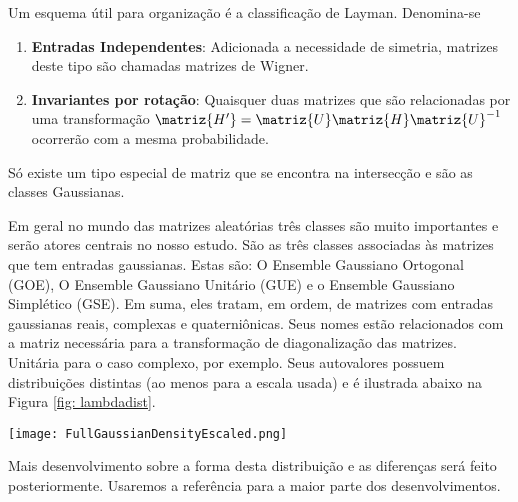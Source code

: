  Um esquema útil para organização é a classificação de Layman. Denomina-se

\begin{enumerate}
	\item \textbf{Entradas Independentes}: Adicionada a necessidade de simetria, matrizes deste tipo são chamadas matrizes de Wigner.
	\item \textbf{Invariantes por rotação}: Quaisquer duas matrizes que são relacionadas por uma transformação $\matriz{H'} = \matriz{U} \matriz{H} \matriz{U}^{-1}$ ocorrerão com a mesma probabilidade.
\end{enumerate}

Só existe um tipo especial de matriz que se encontra na intersecção e são as classes Gaussianas.

Em geral no mundo das matrizes aleatórias três classes são muito importantes e serão atores centrais no nosso estudo. São as três classes associadas às matrizes que tem entradas gaussianas. Estas são: O Ensemble Gaussiano Ortogonal (GOE), O Ensemble Gaussiano Unitário (GUE) e o Ensemble Gaussiano Simplético (GSE). Em suma, eles tratam, em ordem, de matrizes com entradas gaussianas reais, complexas e quaterniônicas. Seus nomes estão relacionados com a matriz necessária para a transformação de diagonalização das matrizes. Unitária para o caso complexo, por exemplo. Seus autovalores possuem distribuições distintas (ao menos para a escala usada) e é ilustrada abaixo na Figura \ref{fig: lambdadist}.

\begin{center}
	\texttt{[image: FullGaussianDensityEscaled.png]}
	\label{fig: lambdadist}
\end{center}

Mais desenvolvimento sobre a forma desta distribuição e as diferenças será feito posteriormente. Usaremos a referência \cite{Livan_2018} para a maior parte dos desenvolvimentos.